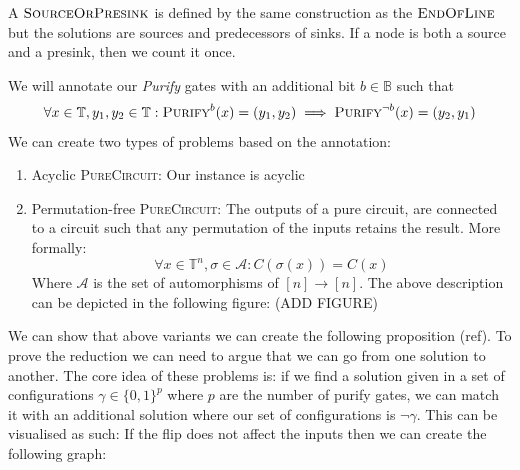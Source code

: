 \begin{definition}
    A $\textnormal{\textsc{SourceOrPresink}}$ is defined by the same construction as the $\textnormal{\textsc{EndOfLine}}$ 
    but the solutions are sources and predecessors of sinks. If a node is both a source
    and a presink, then we count it once.
\end{definition}

We will annotate our \textit{Purify} gates with an additional bit $b \in \mathbb{B}$ such that
$$
\forall x \in \mathbb{T}, y_1, y_2 \in \mathbb{T}: \textsc{Purify}^b(x) = (y_1,y_2) \implies \textsc{Purify}^{\neg {b}}(x) = (y_2, y_1)
$$
We can create two types of problems based on the annotation:
\begin{enumerate}
    \item Acyclic \textsc{PureCircuit}: Our instance is acyclic
    \item Permutation-free \textsc{PureCircuit}: The outputs of a pure circuit, are connected to a circuit such that any permutation of the inputs
        retains the result. More formally:
        $$
        \forall x \in \mathbb{T}^n, \sigma \in \mathcal{A}: C(\sigma(x)) = C(x)
        $$
        Where $\mathcal{A}$ is the set of automorphisms of $[n] \to [n]$.
        The above description can be depicted in the following figure:
        (ADD FIGURE)
\end{enumerate}

We can show that above variants we can create the following proposition (ref).
To prove the reduction we can need to argue that we can go from one solution to another.
The core idea of these problems is:  if we find a solution given in 
a set of configurations $\gamma \in \{0,1\}^p$ where $p$ are the number of purify gates,
we can match it with an additional solution where our set of configurations is $\neg \gamma$.
This can be visualised as such: If the flip does not affect the inputs then we
can create the following graph:

